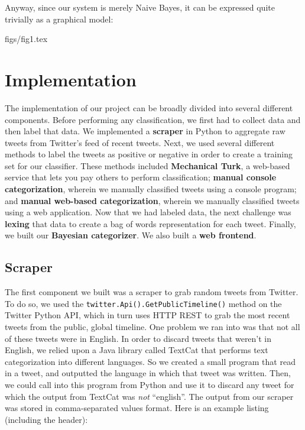 \documentclass[12pt,a4paper]{article}
\begin{document}
Anyway, since our system is merely Naive Bayes, it can be expressed quite trivially as a graphical model:

 { figs/fig1.tex }

\section{ Implementation }

The implementation of our project can be broadly divided into several different components. Before performing any classification, we first had to collect data and then label that data. We implemented a \textbf{scraper} in Python to aggregate raw tweets from Twitter's feed of recent tweets. Next, we used several different methods to label the tweets as positive or negative in order to create a training set for our classifier. These methods included \textbf{Mechanical Turk}, a web-based service that lets you pay others to perform classification; \textbf{manual console categorization}, wherein we manually classified tweets using a console program; and \textbf{manual web-based categorization}, wherein we manually classified tweets using a web application. Now that we had labeled data, the next challenge was \textbf{lexing} that data to create a bag of words representation for each tweet. Finally, we built our \textbf{Bayesian categorizer}. We also built a \textbf{web frontend}.

\subsection { Scraper }

The first component we built was a scraper to grab random tweets from Twitter. To do so, we used the \texttt{twitter.Api().GetPublicTimeline()} method on the Twitter Python API, which in turn uses HTTP REST to grab the most recent tweets from the public, global timeline. One problem we ran into was that not all of these tweets were in English. In order to discard tweets that weren't in English, we relied upon a Java library called TextCat that performs text categorization into different languages. So we created a small program that read in a tweet, and outputted the language in which that tweet was written. Then, we could call into this program from Python and use it to discard any tweet for which the output from TextCat was \emph{not} ``english''. The output from our scraper was stored in comma-separated values format. Here is an example listing (including the header):
\end{document}
